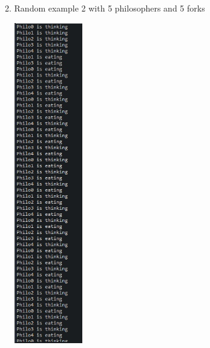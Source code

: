 \documentclass[14pt]{article}
\begin{document}
\begin{center}
2. Random example 2 with 5 philosophers and 5 forks\\
\vspace{5mm}

\includegraphics[height=5.5in, width = 1.5in]{philo2.png}\\
\end{center}\\
\end{document}
